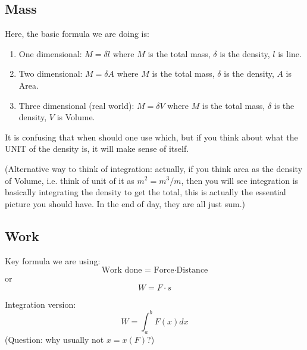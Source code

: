 \documentclass[12pt]{article}
\theoremstyle{definition}
\theoremstyle{definition}
\theoremstyle{remark}
\theoremstyle{definition}
\theoremstyle{definition}
\theoremstyle{definition}
\begin{document}
\subsection{Mass}


Here, the basic formula we are doing is:\begin{enumerate}
\item One dimensional: $M=\delta l$ where $M$ is the total mass, $\delta$ is the density, $l$ is line.
\item
Two dimensional: $M=\delta A$ where $M$ is the total mass, $\delta$ is the density, $A$ is Area.
\item Three dimensional (real world): $M=\delta V$ where $M$ is the total mass, $\delta$ is the density, $V$ is Volume.
\end{enumerate}

It is confusing that when should one use which, but if you think about what the UNIT of the density is, it will make sense of itself. 

(Alternative way to think of integration: actually, if you think area as the density of Volume, i.e. think of unit of it as $m^2=m^3/m$, then you will see integration is basically integrating the density to get the total, this is actually the essential picture you should have. In the end of day, they are all just sum.)


\subsection{Work}

Key formula we are using:\\\[
\text{Work done = Force} \cdot \text{Distance}\] or 
\[W=F\cdot s\]

Integration version:
\[W = \int^b_a F(x) dx\]
(Question: why usually not $x = x(F)$?)
\end{document}
